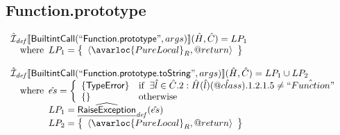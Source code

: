 \subsection{Function.prototype}
\[
\begin{array}{l}
\aI_{\it def}\lbr \SF{BuiltintCall}(``\SF{Function.prototype}",args)\rbr(\hat{H},\hat{C}) = LP_1\\
\quad\wherec{
  LP_1 = \set{\langle\avarloc{PureLocal}_R,\varprop{return}\rangle}\\
  }\\
\\


\aI_{\it def}\lbr \SF{BuiltintCall}(``\SF{Function.prototype.toString}",args)\rbr(\hat{H},\hat{C}) = LP_1 \cup LP_2\\
\quad\wherec{
  \hat{es} = \left\{\begin{array}{ll}
      \{ \SF{TypeError} \}
      & \ifc{\exists\hat{l}\in\hat{C}.2: \hat{H}(\hat{l})(\avarprop{class}).1.2.1.5 \neq \hat{``Function"}}\\
      \set{} & \owc
    \end{array}\right.\\
  LP_1 = \ahf{RaiseException}_{\it def}(\hat{es})\\
  LP_2 = \set{\langle\avarloc{PureLocal}_R,\varprop{return}\rangle}\\
  }\\
\\


\end{array}\]
